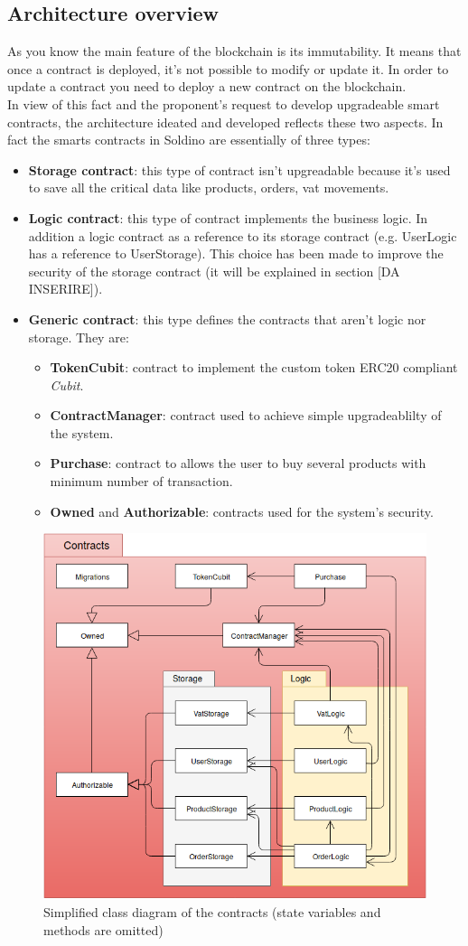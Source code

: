 \subsection{Architecture overview}
As you know the main feature of the blockchain is its immutability. It means that once a contract is 
deployed, it's not possible to modify or update it. In order to update a contract you need to deploy 
a new contract on the blockchain.\\
In view of this fact and the proponent's request to develop upgradeable smart contracts, the architecture ideated and developed reflects these two aspects. In fact the smarts contracts in Soldino
are essentially of three types:
\begin{itemize}
	\item\textbf{Storage contract}: this type of contract isn't upgreadable because it's used
		to save all the critical data like products, orders, vat movements. 
	\item\textbf{Logic contract}: this type of contract implements the business logic. In addition
	a logic contract as a reference to its storage contract (e.g. UserLogic has a reference to UserStorage). This choice has been made to improve the security of the storage contract (it will be explained in section [DA INSERIRE]).
	\item\textbf{Generic contract}: this type defines the contracts that aren't logic nor storage.
	They are:
	\begin{itemize}
		\item\textbf{TokenCubit}: contract to implement the custom token ERC20 compliant \textit{Cubit}.
		\item\textbf{ContractManager}: contract used to achieve simple upgradeablilty of the system.
		\item\textbf{Purchase}: contract to allows the user to buy several products with minimum number of transaction.
		\item\textbf{Owned} and \textbf{Authorizable}: contracts used for the system's security.
	\end{itemize}
\end{itemize}

\begin{figure}[h]
	\centering
	\includegraphics[scale=0.369]{res/images/architecture.png}
	\caption{Simplified class diagram of the contracts (state variables and methods are omitted)}
\end{figure}